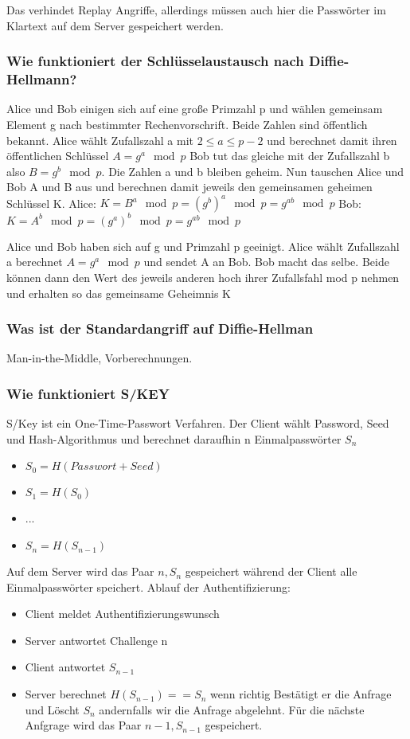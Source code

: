 	Das verhindet Replay Angriffe, allerdings müssen auch hier die Passwörter im Klartext auf dem Server gespeichert werden.
	
		\subsubsection{Wie funktioniert der Schlüsselaustausch nach Diffie-Hellmann?}
	Alice und Bob einigen sich auf eine große Primzahl p und wählen gemeinsam Element g nach bestimmter Rechenvorschrift. Beide Zahlen sind öffentlich bekannt.\newline	
	Alice wählt Zufallszahl a mit $2 \leq a \leq p-2$ und berechnet damit ihren öffentlichen Schlüssel $A=g^a \mod p$
	Bob tut das gleiche mit der Zufallszahl b also $B=g^b \mod p$.
	Die Zahlen a und b bleiben geheim.
	Nun tauschen Alice und Bob A und B aus und berechnen damit jeweils den gemeinsamen geheimen Schlüssel K.\newline	
	Alice: $K=B^a \mod p = (g^b)^a \mod p = g^{ab} \mod p$
	\newline	
	Bob: $K=A^b \mod p = (g^a)^b \mod p = g^{ab} \mod p$
	 
	Alice und Bob haben sich auf g und Primzahl p geeinigt. Alice wählt Zufallszahl a berechnet $A=g^a \mod p$ und sendet A an Bob. Bob macht das selbe. Beide können dann den Wert des jeweils anderen hoch ihrer Zufallsfahl mod p nehmen und erhalten so das gemeinsame Geheimnis K
	
	\subsubsection{Was ist der Standardangriff auf Diffie-Hellman}
	Man-in-the-Middle, Vorberechnungen.
	
	
	\subsubsection{Wie funktioniert S/KEY}
	S/Key ist ein One-Time-Passwort Verfahren. Der Client wählt Password, Seed und Hash-Algorithmus und berechnet daraufhin n Einmalpasswörter $S_n$
	\begin{itemize}
		\item $S_0 = H(Passwort +Seed)$
		\item $S_1 = H(S_0)$
		\item ...
		\item $S_n = H(S_{n-1})$
	\end{itemize}
	Auf dem Server wird das Paar {$n,S_n$} gespeichert während der Client alle Einmalpasswörter speichert.
	Ablauf der Authentifizierung:
	\begin{itemize}
		\item Client meldet Authentifizierungswunsch
		\item Server antwortet Challenge n
		\item Client antwortet $S_{n-1}$
		\item Server berechnet $H(S_{n-1}) == S_n$ wenn richtig Bestätigt er die Anfrage und Löscht $S_n$ andernfalls wir die Anfrage abgelehnt. Für die nächste Anfgrage wird das Paar {$n-1,S_{n-1}$} gespeichert.
	\end{itemize}
	

